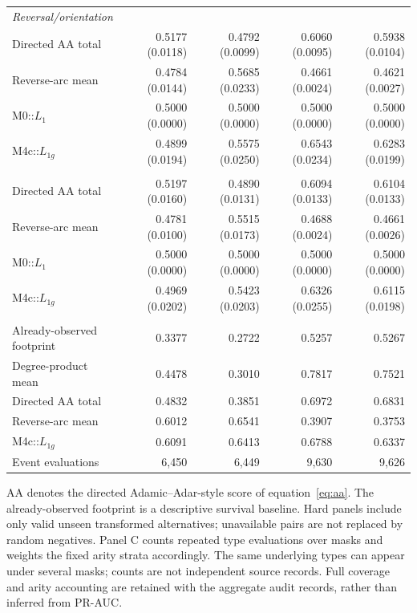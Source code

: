\documentclass[10pt]{article}
\begin{document}
\begin{table}[!t]
\begin{tabular}{@{}lrrrr@{}}
\multicolumn{5}{l}{\emph{Reversal/orientation}}\\
Directed AA total & 0.5177 (0.0118) & 0.4792 (0.0099) & 0.6060 (0.0095) & 0.5938 (0.0104)\\
Reverse-arc mean & 0.4784 (0.0144) & 0.5685 (0.0233) & 0.4661 (0.0024) & 0.4621 (0.0027)\\
M0::$L_1$ & 0.5000 (0.0000) & 0.5000 (0.0000) & 0.5000 (0.0000) & 0.5000 (0.0000)\\
M4c::$L_{1g}$ & 0.4899 (0.0194) & 0.5575 (0.0250) & 0.6543 (0.0234) & 0.6283 (0.0199)\\
\addlinespace
\multicolumn{5}{l}{\emph{Role exchange}}\\
Directed AA total & 0.5197 (0.0160) & 0.4890 (0.0131) & 0.6094 (0.0133) & 0.6104 (0.0133)\\
Reverse-arc mean & 0.4781 (0.0100) & 0.5515 (0.0173) & 0.4688 (0.0024) & 0.4661 (0.0026)\\
M0::$L_1$ & 0.5000 (0.0000) & 0.5000 (0.0000) & 0.5000 (0.0000) & 0.5000 (0.0000)\\
M4c::$L_{1g}$ & 0.4969 (0.0202) & 0.5423 (0.0203) & 0.6326 (0.0255) & 0.6115 (0.0198)\\
\addlinespace
\multicolumn{5}{l}{\textbf{Panel C. Fixed-participant, fixed-arity role assignment}}\\
Already-observed footprint & 0.3377 & 0.2722 & 0.5257 & 0.5267\\
Degree-product mean & 0.4478 & 0.3010 & 0.7817 & 0.7521\\
Directed AA total & 0.4832 & 0.3851 & 0.6972 & 0.6831\\
Reverse-arc mean & 0.6012 & 0.6541 & 0.3907 & 0.3753\\
M4c::$L_{1g}$ & 0.6091 & 0.6413 & 0.6788 & 0.6337\\
Event evaluations & 6,450 & 6,449 & 9,630 & 9,626\\
\bottomrule
\end{tabular}
\par\vspace{4pt}
\begin{minipage}{\textwidth}\footnotesize
AA denotes the directed Adamic--Adar-style score of equation~\eqref{eq:aa}. The already-observed footprint is a descriptive survival baseline. Hard panels include only valid unseen transformed alternatives; unavailable pairs are not replaced by random negatives. Panel C counts repeated type evaluations over masks and weights the fixed arity strata accordingly. The same underlying types can appear under several masks; counts are not independent source records. Full coverage and arity accounting are retained with the aggregate audit records, rather than inferred from PR-AUC.
\end{minipage}
\end{table}
\end{document}
